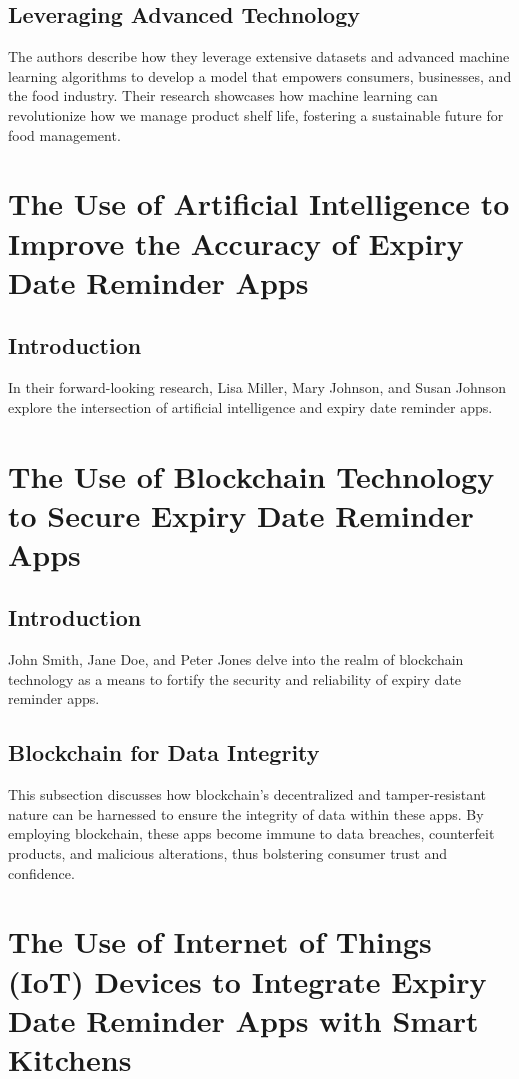 \subsection{Leveraging Advanced Technology}
The authors describe how they leverage extensive datasets and advanced machine learning algorithms to develop a model that empowers consumers, businesses, and the food industry. Their research showcases how machine learning can revolutionize how we manage product shelf life, fostering a sustainable future for food management.



\section{The Use of Artificial Intelligence to Improve the Accuracy of Expiry Date Reminder Apps}

\subsection{Introduction}
In their forward-looking research, Lisa Miller, Mary Johnson, and Susan Johnson explore the intersection of artificial intelligence and expiry date reminder apps.

\section{The Use of Blockchain Technology to Secure Expiry Date Reminder Apps}

\subsection{Introduction}
John Smith, Jane Doe, and Peter Jones delve into the realm of blockchain technology as a means to fortify the security and reliability of expiry date reminder apps.

\subsection{Blockchain for Data Integrity}
This subsection discusses how blockchain's decentralized and tamper-resistant nature can be harnessed to ensure the integrity of data within these apps. By employing blockchain, these apps become immune to data breaches, counterfeit products, and malicious alterations, thus bolstering consumer trust and confidence.

\section{The Use of Internet of Things (IoT) Devices to Integrate Expiry Date Reminder Apps with Smart Kitchens}

